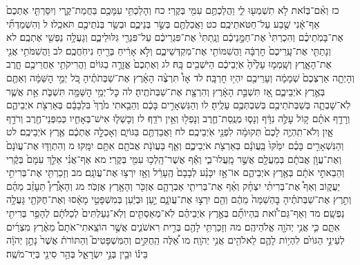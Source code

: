 \documentclass[twoside, openany, parskip=half, 11pt]{book}
\begin{document}
כז וְאִ֨ם־בְּזֹ֔את לֹ֥א תִשְׁמְע֖וּ לִ֑י וַהֲלַכְתֶּ֥ם עִמִּ֖י בְּקֶֽרִי׃ כח וְהָלַכְתִּ֥י עִמָּכֶ֖ם בַּחֲמַת־קֶ֑רִי וְיִסַּרְתִּ֤י אֶתְכֶם֙ אַף־אָ֔נִי שֶׁ֖בַע עַל־חַטֹּאתֵיכֶֽם׃ כט וַאֲכַלְתֶּ֖ם בְּשַׂ֣ר בְּנֵיכֶ֑ם וּבְשַׂ֥ר בְּנֹתֵיכֶ֖ם תֹּאכֵֽלוּ׃ ל וְהִשְׁמַדְתִּ֞י אֶת־בָּמֹֽתֵיכֶ֗ם וְהִכְרַתִּי֙ אֶת־חַמָּ֣נֵיכֶ֔ם וְנָֽתַתִּי֙ אֶת־פִּגְרֵיכֶ֔ם עַל־פִּגְרֵ֖י גִּלּוּלֵיכֶ֑ם וְגָעֲלָ֥ה נַפְשִׁ֖י אֶתְכֶֽם׃ לא וְנָתַתִּ֤י אֶת־עָֽרֵיכֶם֙ חׇרְבָּ֔ה וַהֲשִׁמּוֹתִ֖י אֶת־מִקְדְּשֵׁיכֶ֑ם וְלֹ֣א אָרִ֔יחַ בְּרֵ֖יחַ נִיחֹֽחֲכֶֽם׃ לב וַהֲשִׁמֹּתִ֥י אֲנִ֖י אֶת־הָאָ֑רֶץ וְשָֽׁמְמ֤וּ עָלֶ֙יהָ֙ אֹֽיְבֵיכֶ֔ם הַיֹּשְׁבִ֖ים בָּֽהּ׃ לג וְאֶתְכֶם֙ אֱזָרֶ֣ה בַגּוֹיִ֔ם וַהֲרִיקֹתִ֥י אַחֲרֵיכֶ֖ם חָ֑רֶב וְהָיְתָ֤ה אַרְצְכֶם֙ שְׁמָמָ֔ה וְעָרֵיכֶ֖ם יִהְי֥וּ חׇרְבָּֽה׃ לד אָז֩ תִּרְצֶ֨ה הָאָ֜רֶץ אֶת־שַׁבְּתֹתֶ֗יהָ כֹּ֚ל יְמֵ֣י הׇשַּׁמָּ֔ה וְאַתֶּ֖ם בְּאֶ֣רֶץ אֹיְבֵיכֶ֑ם אָ֚ז תִּשְׁבַּ֣ת הָאָ֔רֶץ וְהִרְצָ֖ת אֶת־שַׁבְּתֹתֶֽיהָ׃ לה כׇּל־יְמֵ֥י הׇשַּׁמָּ֖ה תִּשְׁבֹּ֑ת אֵ֣ת אֲשֶׁ֧ר לֹֽא־שָׁבְתָ֛ה בְּשַׁבְּתֹתֵיכֶ֖ם בְּשִׁבְתְּכֶ֥ם עָלֶֽיהָ׃ לו וְהַנִּשְׁאָרִ֣ים בָּכֶ֔ם וְהֵבֵ֤אתִי מֹ֙רֶךְ֙ בִּלְבָבָ֔ם בְּאַרְצֹ֖ת אֹיְבֵיהֶ֑ם וְרָדַ֣ף אֹתָ֗ם ק֚וֹל עָלֶ֣ה נִדָּ֔ף וְנָס֧וּ מְנֻֽסַת־חֶ֛רֶב וְנָפְל֖וּ וְאֵ֥ין רֹדֵֽף׃ לז וְכָשְׁל֧וּ אִישׁ־בְּאָחִ֛יו כְּמִפְּנֵי־חֶ֖רֶב וְרֹדֵ֣ף אָ֑יִן וְלֹא־תִֽהְיֶ֤ה לָכֶם֙ תְּקוּמָ֔ה לִפְנֵ֖י אֹֽיְבֵיכֶֽם׃ לח וַאֲבַדְתֶּ֖ם בַּגּוֹיִ֑ם וְאָכְלָ֣ה אֶתְכֶ֔ם אֶ֖רֶץ אֹיְבֵיכֶֽם׃ לט וְהַנִּשְׁאָרִ֣ים בָּכֶ֗ם יִמַּ֙קּוּ֙ בַּֽעֲוֺנָ֔ם בְּאַרְצֹ֖ת אֹיְבֵיכֶ֑ם וְאַ֛ף בַּעֲוֺנֹ֥ת אֲבֹתָ֖ם אִתָּ֥ם יִמָּֽקּוּ׃ מ וְהִתְוַדּ֤וּ אֶת־עֲוֺנָם֙ וְאֶת־עֲוֺ֣ן אֲבֹתָ֔ם בְּמַעֲלָ֖ם אֲשֶׁ֣ר מָֽעֲלוּ־בִ֑י וְאַ֕ף אֲשֶׁר־הָֽלְכ֥וּ עִמִּ֖י בְּקֶֽרִי׃ מא אַף־אֲנִ֗י אֵלֵ֤ךְ עִמָּם֙ בְּקֶ֔רִי וְהֵבֵאתִ֣י אֹתָ֔ם בְּאֶ֖רֶץ אֹיְבֵיהֶ֑ם אוֹ־אָ֣ז יִכָּנַ֗ע לְבָבָם֙ הֶֽעָרֵ֔ל וְאָ֖ז יִרְצ֥וּ אֶת־עֲוֺנָֽם׃ מב וְזָכַרְתִּ֖י אֶת־בְּרִיתִ֣י יַעֲק֑וֹב וְאַף֩ אֶת־בְּרִיתִ֨י יִצְחָ֜ק וְאַ֨ף אֶת־בְּרִיתִ֧י אַבְרָהָ֛ם אֶזְכֹּ֖ר וְהָאָ֥רֶץ אֶזְכֹּֽר׃ מג וְהָאָ֩רֶץ֩ תֵּעָזֵ֨ב מֵהֶ֜ם וְתִ֣רֶץ אֶת־שַׁבְּתֹתֶ֗יהָ בׇּהְשַׁמָּה֙ מֵהֶ֔ם וְהֵ֖ם יִרְצ֣וּ אֶת־עֲוֺנָ֑ם יַ֣עַן וּבְיַ֔עַן בְּמִשְׁפָּטַ֣י מָאָ֔סוּ וְאֶת־חֻקֹּתַ֖י גָּעֲלָ֥ה נַפְשָֽׁם׃ מד וְאַף־גַּם־זֹ֠את בִּֽהְיוֹתָ֞ם בְּאֶ֣רֶץ אֹֽיְבֵיהֶ֗ם לֹֽא־מְאַסְתִּ֤ים וְלֹֽא־גְעַלְתִּים֙ לְכַלֹּתָ֔ם לְהָפֵ֥ר בְּרִיתִ֖י אִתָּ֑ם כִּ֛י אֲנִ֥י יְהֹוָ֖ה אֱלֹהֵיהֶֽם׃ מה וְזָכַרְתִּ֥י לָהֶ֖ם בְּרִ֣ית רִאשֹׁנִ֑ים אֲשֶׁ֣ר הוֹצֵֽאתִי־אֹתָם֩ מֵאֶ֨רֶץ מִצְרַ֜יִם לְעֵינֵ֣י הַגּוֹיִ֗ם לִהְי֥וֹת לָהֶ֛ם לֵאלֹהִ֖ים אֲנִ֥י יְהֹוָֽה׃ מו אֵ֠לֶּה הַֽחֻקִּ֣ים וְהַמִּשְׁפָּטִים֮ וְהַתּוֹרֹת֒ אֲשֶׁר֙ נָתַ֣ן יְהֹוָ֔ה בֵּינ֕וֹ וּבֵ֖ין בְּנֵ֣י יִשְׂרָאֵ֑ל בְּהַ֥ר סִינַ֖י בְּיַד־מֹשֶֽׁה׃
\end{document}
